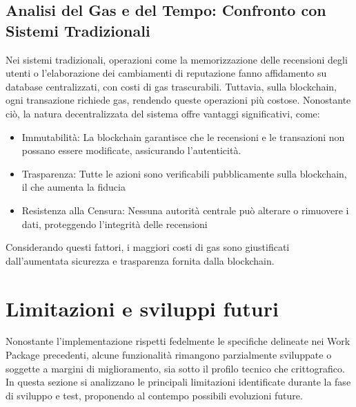         \subsection{Analisi del Gas e del Tempo: Confronto con Sistemi Tradizionali}
            Nei sistemi tradizionali, operazioni come la memorizzazione delle recensioni degli utenti o l'elaborazione dei cambiamenti di reputazione fanno affidamento su database centralizzati, con costi di gas trascurabili. Tuttavia, sulla blockchain, ogni transazione richiede gas, rendendo queste operazioni più costose. Nonostante ciò, la natura decentralizzata del sistema offre vantaggi significativi, come:
                \begin{itemize}
                    \item Immutabilità: La blockchain garantisce che le recensioni e le transazioni non possano essere modificate, assicurando l'autenticità.
    
                    \item Trasparenza: Tutte le azioni sono verificabili pubblicamente sulla blockchain, il che aumenta la fiducia
    
                    \item Resistenza alla Censura: Nessuna autorità centrale può alterare o rimuovere i dati, proteggendo l'integrità delle recensioni
                \end{itemize}
    
            \noindent Considerando questi fattori, i maggiori costi di gas sono giustificati dall'aumentata sicurezza e trasparenza fornita dalla blockchain.
        
    \section{Limitazioni e sviluppi futuri}
        Nonostante l'implementazione rispetti fedelmente le specifiche delineate nei Work Package precedenti, alcune funzionalità rimangono parzialmente sviluppate o soggette a margini di miglioramento, sia sotto il profilo tecnico che crittografico. In questa sezione si analizzano le principali limitazioni identificate durante la fase di sviluppo e test, proponendo al contempo possibili evoluzioni future.
        
